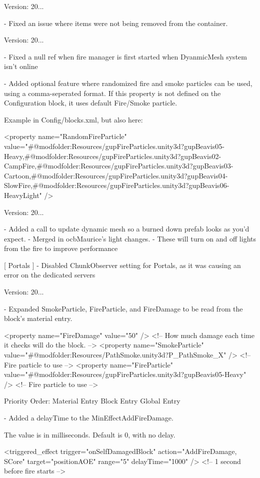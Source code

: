 Version\+: 20... \begin{DoxyVerb}
    - Fixed an issue where items were not being removed from the container.
\end{DoxyVerb}
 Version\+: 20... \begin{DoxyVerb}
    - Fixed a null ref when fire manager is first started when DyanmicMesh system isn't online

    - Added optional feature where randomized fire and smoke particles can be used, using a comma-seperated format.
        If this property is not defined on the Configuration block, it uses default Fire/Smoke particle.

        Example in Config/blocks.xml, but also here:

                <property name="RandomFireParticle" value="#@modfolder:Resources/gupFireParticles.unity3d?gupBeavis05-Heavy,#@modfolder:Resources/gupFireParticles.unity3d?gupBeavis02-CampFire,#@modfolder:Resources/gupFireParticles.unity3d?gupBeavis03-Cartoon,#@modfolder:Resources/gupFireParticles.unity3d?gupBeavis04-SlowFire,#@modfolder:Resources/gupFireParticles.unity3d?gupBeavis06-HeavyLight" />
\end{DoxyVerb}
 Version\+: 20... \begin{DoxyVerb}
    - Added a call to update dynamic mesh so a burned down prefab looks as you'd expect.
    - Merged in ocbMaurice's light changes.
        - These will turn on and off lights from the fire to improve performance

[ Portals ]
    - Disabled ChunkObserver setting for Portals, as it was causing an error on the dedicated servers
\end{DoxyVerb}


Version\+: 20... \begin{DoxyVerb}

    - Expanded SmokeParticle, FireParticle, and FireDamage to be read from the block's material entry.

        <property name="FireDamage" value="50" />               <!-- How much damage each time it checks will do the block. -->
        <property name="SmokeParticle" value="#@modfolder:Resources/PathSmoke.unity3d?P_PathSmoke_X" />     <!-- Fire particle to use -->
        <property name="FireParticle" value="#@modfolder:Resources/gupFireParticles.unity3d?gupBeavis05-Heavy" /> <!-- Fire particle to use -->

        Priority Order:  
            Material Entry
            Block Entry
            Global Entry

    - Added a delayTime to the MinEffectAddFireDamage. 

        The value is in milliseconds. Default is 0, with no delay.

        <triggered_effect trigger="onSelfDamagedBlock" action="AddFireDamage, SCore" target="positionAOE" range="5" delayTime="1000" /> <!-- 1 second before fire starts -->
\end{DoxyVerb}


